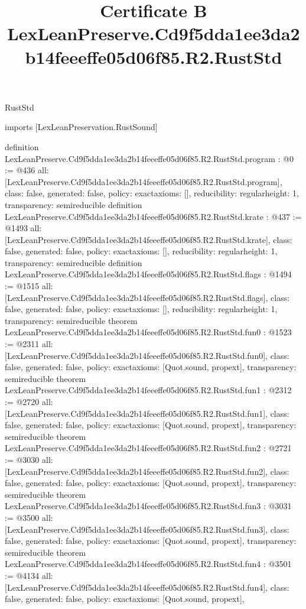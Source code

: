 \begin{lexlean}{RustStd}
\title{Certificate B LexLeanPreserve.Cd9f5dda1ee3da2b14feeeffe05d06f85.R2.RustStd}
\begin{coremodule}
imports [LexLeanPreservation.RustSound]

definition LexLeanPreserve.Cd9f5dda1ee3da2b14feeeffe05d06f85.R2.RustStd.program : @0 := @436 {
  all: [LexLeanPreserve.Cd9f5dda1ee3da2b14feeeffe05d06f85.R2.RustStd.program],
  class: false,
  generated: false,
  policy: exact{axioms: []},
  reducibility: regular{height: 1},
  transparency: semireducible
}
definition LexLeanPreserve.Cd9f5dda1ee3da2b14feeeffe05d06f85.R2.RustStd.krate : @437 := @1493 {
  all: [LexLeanPreserve.Cd9f5dda1ee3da2b14feeeffe05d06f85.R2.RustStd.krate],
  class: false,
  generated: false,
  policy: exact{axioms: []},
  reducibility: regular{height: 1},
  transparency: semireducible
}
definition LexLeanPreserve.Cd9f5dda1ee3da2b14feeeffe05d06f85.R2.RustStd.flags : @1494 := @1515 {
  all: [LexLeanPreserve.Cd9f5dda1ee3da2b14feeeffe05d06f85.R2.RustStd.flags],
  class: false,
  generated: false,
  policy: exact{axioms: []},
  reducibility: regular{height: 1},
  transparency: semireducible
}
theorem LexLeanPreserve.Cd9f5dda1ee3da2b14feeeffe05d06f85.R2.RustStd.fun0 : @1523 := @2311 {
  all: [LexLeanPreserve.Cd9f5dda1ee3da2b14feeeffe05d06f85.R2.RustStd.fun0],
  class: false,
  generated: false,
  policy: exact{axioms: [Quot.sound, propext]},
  transparency: semireducible
}
theorem LexLeanPreserve.Cd9f5dda1ee3da2b14feeeffe05d06f85.R2.RustStd.fun1 : @2312 := @2720 {
  all: [LexLeanPreserve.Cd9f5dda1ee3da2b14feeeffe05d06f85.R2.RustStd.fun1],
  class: false,
  generated: false,
  policy: exact{axioms: [Quot.sound, propext]},
  transparency: semireducible
}
theorem LexLeanPreserve.Cd9f5dda1ee3da2b14feeeffe05d06f85.R2.RustStd.fun2 : @2721 := @3030 {
  all: [LexLeanPreserve.Cd9f5dda1ee3da2b14feeeffe05d06f85.R2.RustStd.fun2],
  class: false,
  generated: false,
  policy: exact{axioms: [Quot.sound, propext]},
  transparency: semireducible
}
theorem LexLeanPreserve.Cd9f5dda1ee3da2b14feeeffe05d06f85.R2.RustStd.fun3 : @3031 := @3500 {
  all: [LexLeanPreserve.Cd9f5dda1ee3da2b14feeeffe05d06f85.R2.RustStd.fun3],
  class: false,
  generated: false,
  policy: exact{axioms: [Quot.sound, propext]},
  transparency: semireducible
}
theorem LexLeanPreserve.Cd9f5dda1ee3da2b14feeeffe05d06f85.R2.RustStd.fun4 : @3501 := @4134 {
  all: [LexLeanPreserve.Cd9f5dda1ee3da2b14feeeffe05d06f85.R2.RustStd.fun4],
  class: false,
  generated: false,
  policy: exact{axioms: [Quot.sound, propext]},
}
\end{coremodule}
\end{lexlean}
